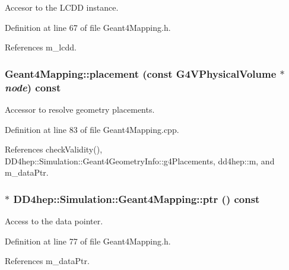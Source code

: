 Accesor to the LCDD instance. 

Definition at line 67 of file Geant4Mapping.h.

References m\_\-lcdd.\hypertarget{class_d_d4hep_1_1_simulation_1_1_geant4_mapping_ae8bbc46d6f8a7d3a8b2ffd1322a01d1e}{
\subsubsection[{placement}]{ Geant4Mapping::placement (const G4VPhysicalVolume $\ast$ {\em node}) const}}
\label{class_d_d4hep_1_1_simulation_1_1_geant4_mapping_ae8bbc46d6f8a7d3a8b2ffd1322a01d1e}


Accessor to resolve geometry placements. 

Definition at line 83 of file Geant4Mapping.cpp.

References checkValidity(), DD4hep::Simulation::Geant4GeometryInfo::g4Placements, dd4hep::m, and m\_\-dataPtr.\hypertarget{class_d_d4hep_1_1_simulation_1_1_geant4_mapping_a2bb27aff241a897321e96001b85783da}{
\subsubsection[{ptr}]{$\ast$ DD4hep::Simulation::Geant4Mapping::ptr () const}}
\label{class_d_d4hep_1_1_simulation_1_1_geant4_mapping_a2bb27aff241a897321e96001b85783da}


Access to the data pointer. 

Definition at line 77 of file Geant4Mapping.h.

References m\_\-dataPtr.

